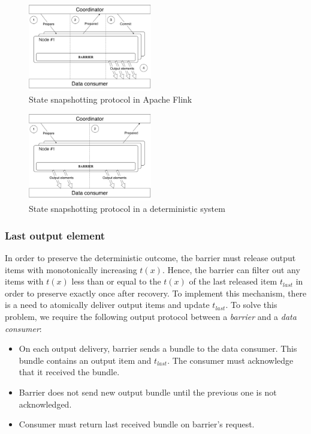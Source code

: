 \begin{figure}[htbp]
  \centering
  \includegraphics[width=0.48\textwidth]{pics/protocol-flink}
  \caption{State snapshotting protocol in Apache Flink}
  \label{protocol_flink}
\end{figure}

\begin{figure}[htbp]
  \centering
  \includegraphics[width=0.48\textwidth]{pics/protocol-fs}
  \caption{State snapshotting protocol in a deterministic system}
  \label{protocol_fs}
\end{figure}

\subsubsection{Last output element}

In order to preserve the deterministic outcome, the barrier must release output items with monotonically increasing $t(x)$. Hence, the barrier can filter out any items with $t(x)$ less than or equal to the $t(x)$ of the last released item $t_{last}$ in order to preserve exactly once after recovery. To implement this mechanism, there is a need to atomically deliver output items and update $t_{last}$. To solve this problem, we require the following output protocol between a {\em barrier} and a {\em data consumer}: 

\begin{itemize}
    \item On each output delivery, barrier sends a bundle to the data consumer. This bundle contains an output item and $t_{last}$. The consumer must acknowledge that it received the bundle.
    \item Barrier does not send new output bundle until the previous one is not acknowledged.
    \item Consumer must return last received bundle on barrier's request.
\end{itemize}

